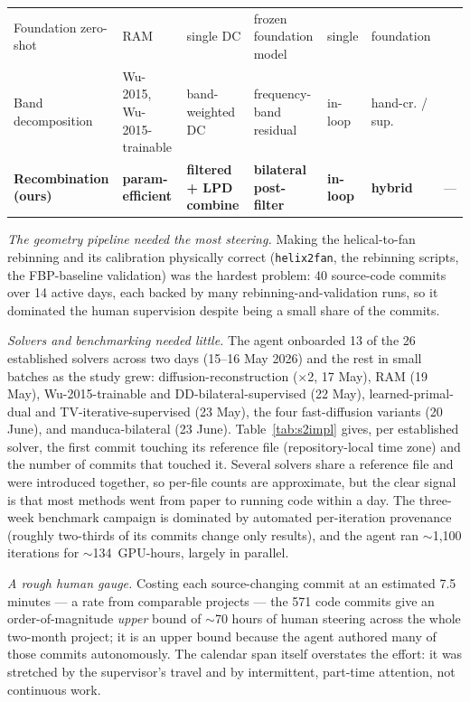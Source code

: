 \documentclass[AMA,twocolumn]{USG}
\begin{document}
\begin{table}[tb]
{\begin{tabular}{@{}lllllll@{}}
Foundation zero-shot      & RAM                                  & single DC              & frozen foundation model   & single         & foundation & \cite{terris2025ram} \\
Band decomposition        & Wu-2015, Wu-2015-trainable           & band-weighted DC       & frequency-band residual   & in-loop        & hand-cr. / sup. & \cite{wu2015sparseview} \\
\textbf{Recombination (ours)} & \textbf{param-efficient}         & \textbf{filtered + LPD combine} & \textbf{bilateral post-filter} & \textbf{in-loop} & \textbf{hybrid} & --- \\
\bottomrule
\end{tabular}}
\end{table}



\emph{The geometry pipeline needed the most steering.} Making the helical-to-fan rebinning and its calibration physically correct (\texttt{helix2fan}, the rebinning scripts, the FBP-baseline validation) was the hardest problem: 40 source-code commits over 14 active days, each backed by many rebinning-and-validation runs, so it dominated the human supervision despite being a small share of the commits.

\emph{Solvers and benchmarking needed little.} The agent onboarded 13 of the 26 established solvers across two days (15--16 May 2026) and the rest in small batches as the study grew: diffusion-reconstruction ($\times$2, 17 May), RAM (19 May), Wu-2015-trainable and DD-bilateral-supervised (22 May), learned-primal-dual and TV-iterative-supervised (23 May), the four fast-diffusion variants (20 June), and manduca-bilateral (23 June). Table~\ref{tab:s2impl} gives, per established solver, the first commit touching its reference file (repository-local time zone) and the number of commits that touched it. Several solvers share a reference file and were introduced together, so per-file counts are approximate, but the clear signal is that most methods went from paper to running code within a day. The three-week benchmark campaign is dominated by automated per-iteration provenance (roughly two-thirds of its commits change only results), and the agent ran $\sim$1{,}100 iterations for $\sim$134~GPU-hours, largely in parallel.

\emph{A rough human gauge.} Costing each source-changing commit at an estimated 7.5 minutes --- a rate from comparable projects --- the 571 code commits give an order-of-magnitude \emph{upper} bound of $\sim$70 hours of human steering across the whole two-month project; it is an upper bound because the agent authored many of those commits autonomously. The calendar span itself overstates the effort: it was stretched by the supervisor's travel and by intermittent, part-time attention, not continuous work.
\end{document}
